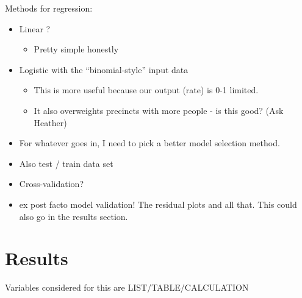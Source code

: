 \documentclass[12pt,twoside]{reedthesis}
\providecommand{\tightlist}{%
  \setlength{\itemsep}{0pt}\setlength{\parskip}{0pt}}
\theoremstyle{definition}
\theoremstyle{definition}
\theoremstyle{definition}
\theoremstyle{remark}
\begin{document}
Methods for regression:
\begin{itemize}
\tightlist
\item
  Linear ?
  \begin{itemize}
  \tightlist
  \item
    Pretty simple honestly
  \end{itemize}
\item
  Logistic with the ``binomial-style'' input data
  \begin{itemize}
  \tightlist
  \item
    This is more useful because our output (rate) is 0-1 limited.
  \item
    It also overweights precincts with more people - is this good? (Ask
    Heather)
  \end{itemize}
\item
  For whatever goes in, I need to pick a better model selection method.
\item
  Also test / train data set
\item
  Cross-validation?
\item
  ex post facto model validation! The residual plots and all that. This
  could also go in the results section.
\end{itemize}
\hypertarget{results}{%
\chapter{Results}\label{results}}

Variables considered for this are LIST/TABLE/CALCULATION
\end{document}
